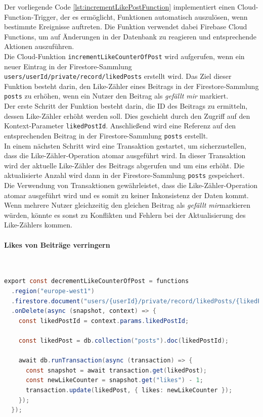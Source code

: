 Der vorliegende Code \ref{lst:incrementLikePostFunction} implementiert einen Cloud-Function-Trigger, der es ermöglicht, Funktionen automatisch auszulösen, wenn bestimmte Ereignisse auftreten. Die Funktion verwendet dabei Firebase Cloud Functions, um auf Änderungen in der Datenbank zu reagieren und entsprechende Aktionen auszuführen.
\\
Die Cloud-Funktion \texttt{incrementLikeCounterOfPost} wird aufgerufen, wenn ein neuer Eintrag in der Firestore-Sammlung \texttt{users/{userId}/private/record/likedPosts} erstellt wird. Das Ziel dieser Funktion besteht darin, den Like-Zähler eines Beitrags in der Firestore-Sammlung \texttt{posts} zu erhöhen, wenn ein Nutzer den Beitrag als \textit{gefällt mir} markiert.
\\
Der erste Schritt der Funktion besteht darin, die ID des Beitrags zu ermitteln, dessen Like-Zähler erhöht werden soll. Dies geschieht durch den Zugriff auf den Kontext-Parameter \texttt{likedPostId}. Anschließend wird eine Referenz auf den entsprechenden Beitrag in der Firestore-Sammlung \texttt{posts} erstellt.
\\
In einem nächsten Schritt wird eine Transaktion gestartet, um sicherzustellen, dass die Like-Zähler-Operation atomar ausgeführt wird. In dieser Transaktion wird der aktuelle Like-Zähler des Beitrags abgerufen und um eins erhöht. Die aktualisierte Anzahl wird dann in der Firestore-Sammlung \texttt{posts} gespeichert.
\\
Die Verwendung von Transaktionen gewährleistet, dass die Like-Zähler-Operation atomar ausgeführt wird und es somit zu keiner Inkonsistenz der Daten kommt. Wenn mehrere Nutzer gleichzeitig den gleichen Beitrag als \textit{gefällt mir}markieren würden, könnte es sonst zu Konflikten und Fehlern bei der Aktualisierung des Like-Zählers kommen.

\paragraph{Likes von Beiträge verringern}\mbox{} \\

\begin{lstlisting}[language=Java,caption=decrementLikeCounterOfPost Funktion,label=lst:decrementLikePostFunction]
  export const decrementLikeCounterOfPost = functions
  .region("europe-west1")
  .firestore.document("users/{userId}/private/record/likedPosts/{likedPostId}")
  .onDelete(async (snapshot, context) => {
    const likedPostId = context.params.likedPostId;

    const likedPost = db.collection("posts").doc(likedPostId);

    await db.runTransaction(async (transaction) => {
      const snapshot = await transaction.get(likedPost);
      const newLikeCounter = snapshot.get("likes") - 1;
      transaction.update(likedPost, { likes: newLikeCounter });
    });
  });
\end{lstlisting}

